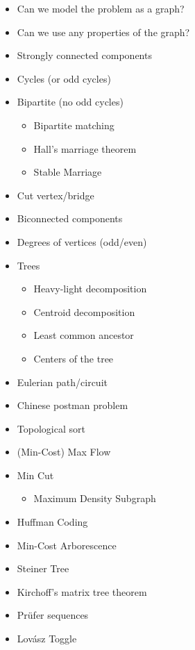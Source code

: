 \begin{myitemize}
\begin{itemize}
          \item Can we model the problem as a graph?
          \item Can we use any properties of the graph?
          \item Strongly connected components
          \item Cycles (or odd cycles)
          \item Bipartite (no odd cycles)
            \begin{itemize}
              \item Bipartite matching
              \item Hall's marriage theorem
              \item Stable Marriage
            \end{itemize}
          \item Cut vertex/bridge
          \item Biconnected components
          \item Degrees of vertices (odd/even)
          \item Trees
            \begin{itemize}
              \item Heavy-light decomposition
              \item Centroid decomposition
              \item Least common ancestor
              \item Centers of the tree
            \end{itemize}
          \item Eulerian path/circuit
          \item Chinese postman problem
          \item Topological sort
          \item (Min-Cost) Max Flow
          \item Min Cut
            \begin{itemize}
              \item Maximum Density Subgraph
            \end{itemize}
          \item Huffman Coding
          \item Min-Cost Arborescence
          \item Steiner Tree
          \item Kirchoff's matrix tree theorem
          \item Pr\"ufer sequences
          \item Lov\'asz Toggle

\end{itemize}
\end{myitemize}
